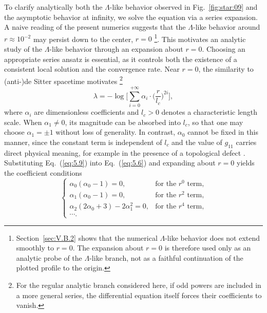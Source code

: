 \documentclass[aps,prd,twocolumn]{revtex4-2}
\begin{document}
To clarify analytically both the $\Lambda$-like behavior observed in Fig.~\ref{fig:star:09} and the asymptotic behavior at infinity, we solve the equation via a series expansion. A naive reading of the present numerics suggests that the $\Lambda$-like behavior around $r\approx10^{-2}$ may persist down to the center, $r=0$ \footnote{Section~\ref{sec:V.B.2} shows that the numerical $\Lambda$-like behavior does not extend smoothly to $r=0$. The expansion about $r=0$ is therefore used only as an analytic probe of the $\Lambda$-like branch, not as a faithful continuation of the plotted profile to the origin.}. This motivates an analytic study of the $\Lambda$-like behavior through an expansion about $r=0$. Choosing an appropriate series ansatz is essential, as it controls both the existence of a consistent local solution and the convergence rate. Near $r=0$, the similarity to (anti-)de Sitter spacetime motivates \footnote{For the regular analytic branch considered here, if odd powers are included in a more general series, the differential equation itself forces their coefficients to vanish.}
\begin{equation}\label{eq:5.9}
  \lambda = - \log \bigg[ \sum_{i=0}^{+\infty} \alpha_i\cdot\Big(\frac{r}{l_c}\Big)^{2i} \bigg],
\end{equation}
where $\alpha_i$ are dimensionless coefficients and $l_c>0$ denotes a characteristic length scale. When $\alpha_1\neq0$, its magnitude can be absorbed into $l_c$, so that one may choose $\alpha_1=\pm1$ without loss of generality. In contrast, $\alpha_0$ cannot be fixed in this manner, since the constant term is independent of $l_c$ and the value of $g_{11}$ carries direct physical meaning, for example in the presence of a topological defect \cite{Barriola1989.PRL.63.341}. Substituting Eq.~(\ref{eq:5.9}) into Eq.~(\ref{eq:5.6}) and expanding about $r=0$ yields the coefficient conditions
\begin{equation}\label{eq:5.10}
\begin{cases}
  \alpha_0 (\alpha_0-1) = 0,                 & \text{for the $r^0$ term,} \\
  \alpha_1 (\alpha_0-1) = 0,                 & \text{for the $r^2$ term,} \\
  \alpha_2 (2\alpha_0+3) - 2\alpha_1^2 = 0,  & \text{for the $r^4$ term,} \\
  \cdots.
\end{cases}
\end{equation}
\end{document}
